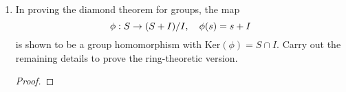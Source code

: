 \begin{itemize}
\begin{enumerate}[(a)]
\begin{enumerate}[i]
\begin{proof}
           \end{proof}

        \item In proving the diamond theorem for groups, the map $$\phi : S \rightarrow (S + I)/I, \ \ \ \phi(s) = s + I$$ is shown to be a group homomorphism with $\text{Ker}(\phi) = S \cap I$. Carry out the remaining details to prove the ring-theoretic version.
           \begin{proof}

           \end{proof}
        \end{enumerate}
\end{enumerate}




\end{itemize}